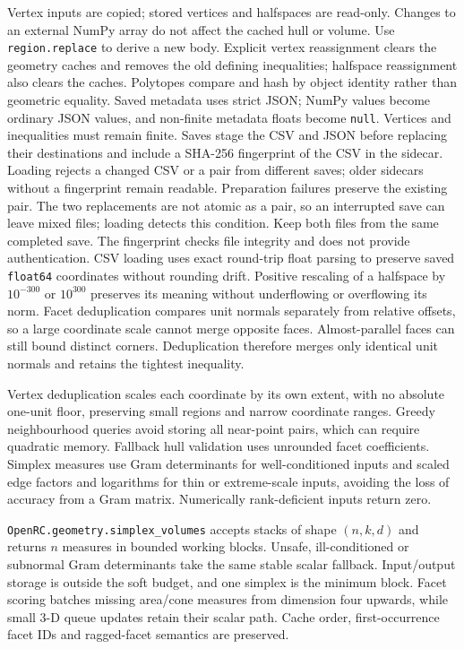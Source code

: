 \documentclass[11pt,a4paper]{report}
\newcommand{\code}[1]{\texttt{\small #1}}
\begin{document}
Vertex inputs are copied; stored vertices and halfspaces are read-only.
Changes to an external NumPy array do not affect the cached hull or volume.
Use \code{region.replace} to derive a new body. Explicit vertex reassignment
clears the geometry caches and removes the old defining inequalities;
halfspace reassignment also clears the caches.
Polytopes compare and hash by object identity rather than geometric equality.
Saved metadata uses strict JSON; NumPy values become
ordinary JSON values, and non-finite metadata floats become \code{null}.
Vertices and inequalities must remain finite. Saves stage the CSV and JSON
before replacing their destinations and include a SHA-256 fingerprint of the
CSV in the sidecar. Loading rejects a changed CSV or a pair from different
saves; older sidecars without a fingerprint remain readable. Preparation
failures preserve the existing pair. The two replacements are not atomic as
a pair, so an interrupted save can leave mixed files; loading detects this
condition. Keep both files from the same completed save. The fingerprint
checks file integrity and does not provide authentication.
CSV loading uses exact round-trip float parsing to preserve saved
\code{float64} coordinates without rounding drift.
Positive rescaling of a halfspace by $10^{-300}$ or $10^{300}$ preserves its
meaning without underflowing or overflowing its norm. Facet deduplication
compares unit normals separately from relative offsets, so a large coordinate
scale cannot merge opposite faces. Almost-parallel faces can still bound
distinct corners. Deduplication therefore merges only identical unit normals
and retains the tightest inequality.

Vertex deduplication scales each coordinate by its own extent, with no absolute
one-unit floor, preserving small regions and narrow coordinate ranges.
Greedy neighbourhood queries avoid storing all near-point pairs, which can
require quadratic memory. Fallback hull validation uses unrounded facet
coefficients. Simplex measures use Gram determinants for well-conditioned
inputs and scaled edge factors and logarithms for thin or extreme-scale
inputs, avoiding the loss of accuracy from a Gram matrix. Numerically
rank-deficient inputs return zero.

\code{OpenRC.geometry.simplex\_volumes} accepts stacks of shape $(n,k,d)$
and returns $n$ measures in bounded working blocks. Unsafe, ill-conditioned
or subnormal Gram determinants take the same stable scalar fallback.
Input/output storage is outside the soft budget, and one simplex is the
minimum block. Facet scoring batches missing area/cone measures from dimension
four upwards, while small 3-D queue updates retain their scalar path. Cache
order, first-occurrence facet IDs and ragged-facet semantics are preserved.
\end{document}

